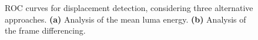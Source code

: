 \documentclass{llncs}
\begin{document}
\begin{figure}[t]
\centering
{}
\caption{ROC curves for displacement detection, considering three alternative approaches. \textbf{(a)} Analysis of the mean luma energy. \textbf{(b)} Analysis of the frame differencing.}
\label{fig:ROC}
\end{figure}
\end{document}
